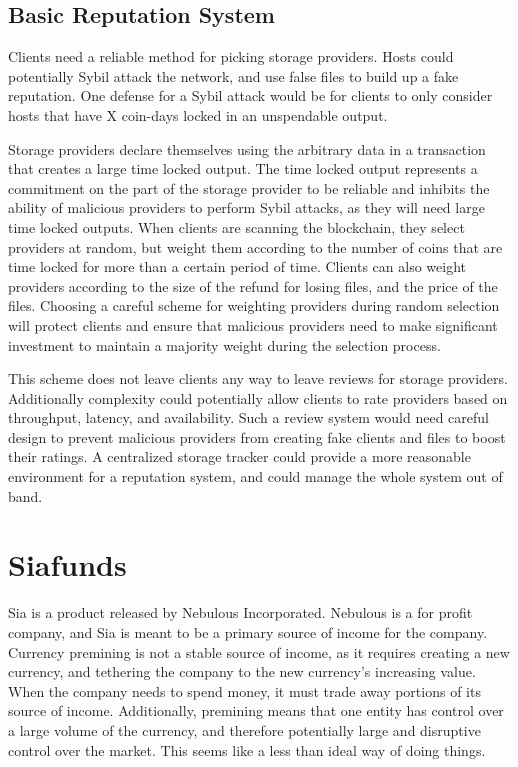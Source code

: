 \documentclass[twocolumn]{article}
\begin{document}
\subsection{Basic Reputation System}
Clients need a reliable method for picking storage providers.
Hosts could potentially Sybil attack the network, and use false files to build up a fake reputation.
One defense for a Sybil attack would be for clients to only consider hosts that have X coin-days locked in an unspendable output.

Storage providers declare themselves using the arbitrary data in a transaction that creates a large time locked output.
The time locked output represents a commitment on the part of the storage provider to be reliable and inhibits the ability of malicious providers to perform Sybil attacks, as they will need large time locked outputs.
When clients are scanning the blockchain, they select providers at random, but weight them according to the number of coins that are time locked for more than a certain period of time.
Clients can also weight providers according to the size of the refund for losing files, and the price of the files.
Choosing a careful scheme for weighting providers during random selection will protect clients and ensure that malicious providers need to make significant investment to maintain a majority weight during the selection process.

This scheme does not leave clients any way to leave reviews for storage providers.
Additionally complexity could potentially allow clients to rate providers based on throughput, latency, and availability.
Such a review system would need careful design to prevent malicious providers from creating fake clients and files to boost their ratings.
A centralized storage tracker could provide a more reasonable environment for a reputation system, and could manage the whole system out of band.

\section{Siafunds}
Sia is a product released by Nebulous Incorporated.
Nebulous is a for profit company, and Sia is meant to be a primary source of income for the company.
Currency premining is not a stable source of income, as it requires creating a new currency, and tethering the company to the new currency's increasing value.
When the company needs to spend money, it must trade away portions of its source of income.
Additionally, premining means that one entity has control over a large volume of the currency, and therefore potentially large and disruptive control over the market.
This seems like a less than ideal way of doing things.
\end{document}
